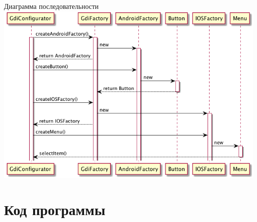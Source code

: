 \documentclass[PI,LAB]{HSEUniversity}
\begin{document}
\begin{FIGURE}[h]{Диаграмма последовательности\label{fig:example-figure}}
	\includegraphics[width=\textwidth]{../out/diagrams/seq-go/seq-go}
\end{FIGURE}



\section{Код программы }



\lstset{extendedchars=\true}
\end{document}
